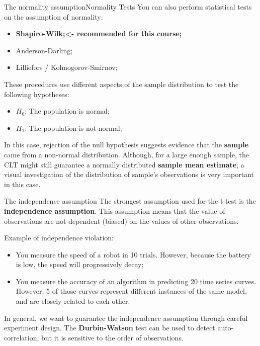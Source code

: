 \begin{frame}{The normality assumption}{Normality Tests}
  You can also perform statistical tests on the assumption of normality:
  \begin{itemize}
    \item {\bf Shapiro-Wilk;\hfill <- recommended for this course;}
    \item Anderson-Darling;
    \item Lilliefors / Kolmogorov-Smirnov;
  \end{itemize}\bigskip

  These procedures use different aspects of the sample distribution to test the following hypotheses:
  \begin{itemize}
    \item $H_0$: The population is normal;
    \item $H_1$: The population is not normal;
  \end{itemize}\bigskip

  In this case, rejection of the null hypothesis suggests evidence that the {\bf sample} came from a non-normal distribution. Although, for a large enough sample, the CLT might still guarantee a normally distributed {\bf sample mean estimate}, a visual investigation of the distribution of sample's observations is very important in this case.
\end{frame}

\begin{frame}{The independence assumption}
  The strongest assumption used for the t-test is the {\bf independence assumption}. This assumption means that the value of observations are not dependent (biased) on the values of other observations.\bigskip

  Example of independence violation:
  \begin{itemize}
    \item You measure the speed of a robot in 10 trials. However, because the battery is low, the speed will progressively decay;
    \item You measure the accuracy of an algorithm in predicting 20 time series curves. However, 5 of those curves represent different instances of the same model, and are closely related to each other.
  \end{itemize}\bigskip

  In general, we want to guarantee the independence assumption through careful experiment design. The {\bf Durbin-Watson} test can be used to detect auto-correlation, but it is sensitive to the order of observations.
\end{frame}

